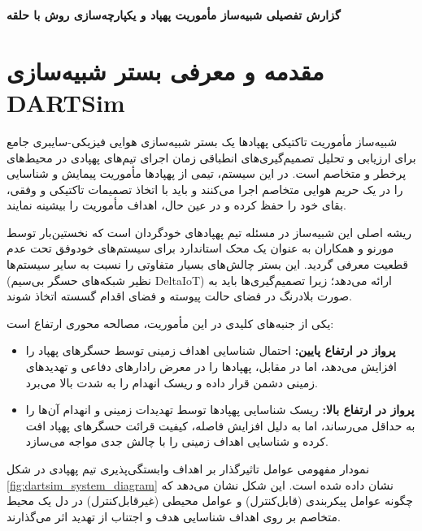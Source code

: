 \documentclass[oneside,openany,a4paper,12pt]{article}
\providecommand{\AutoPersianDigits}{}
\begin{document}
\AutoPersianDigits
{}

\begin{center}
    \vspace*{1cm}
    \Huge\textbf{گزارش تفصیلی شبیه‌ساز مأموریت پهپاد  و یکپارچه‌سازی روش  با حلقه }
\end{center}

\newpage
\tableofcontents
\newpage

\section{مقدمه و معرفی بستر شبیه‌سازی DARTSim}
شبیه‌ساز مأموریت تاکتیکی پهپادها  \cite{MorenoDART2019} یک بستر شبیه‌سازی هوایی فیزیکی-سایبری جامع برای ارزیابی و تحلیل تصمیم‌گیری‌های انطباقی زمان اجرای تیم‌های پهپادی در محیط‌های پرخطر و متخاصم است. در این سیستم، تیمی از پهپادها مأموریت پیمایش و شناسایی را در یک حریم هوایی متخاصم اجرا می‌کنند و باید با اتخاذ تصمیمات تاکتیکی و وفقی، بقای خود را حفظ کرده و در عین حال، اهداف مأموریت را بیشینه نمایند.

ریشه اصلی این شبیه‌ساز در مسئله تیم پهپادهای خودگردان  است که نخستین‌بار توسط مورنو و همکاران \cite{moreno2015proactive} به عنوان یک محک استاندارد برای سیستم‌های خودوفق تحت عدم قطعیت معرفی گردید. این بستر چالش‌های بسیار متفاوتی را نسبت به سایر سیستم‌ها (نظیر شبکه‌های حسگر بی‌سیم DeltaIoT) ارائه می‌دهد؛ زیرا تصمیم‌گیری‌ها باید به صورت بلادرنگ در فضای حالت پیوسته و فضای اقدام گسسته اتخاذ شوند.

یکی از جنبه‌های کلیدی در این مأموریت، مصالحه محوری ارتفاع  است:
\begin{itemize}
    \item \textbf{پرواز در ارتفاع پایین:} احتمال شناسایی اهداف زمینی توسط حسگرهای پهپاد را افزایش می‌دهد، اما در مقابل، پهپادها را در معرض رادارهای دفاعی و تهدیدهای زمینی دشمن قرار داده و ریسک انهدام را به شدت بالا می‌برد.
    \item \textbf{پرواز در ارتفاع بالا:} ریسک شناسایی پهپادها توسط تهدیدات زمینی و انهدام آن‌ها را به حداقل می‌رساند، اما به دلیل افزایش فاصله، کیفیت قرائت حسگرهای پهپاد افت کرده و شناسایی اهداف زمینی را با چالش جدی مواجه می‌سازد.
\end{itemize}

نمودار مفهومی عوامل تاثیرگذار بر اهداف وابستگی‌پذیری تیم پهپادی در شکل \ref{fig:dartsim_system_diagram} نشان داده شده است. این شکل نشان می‌دهد که چگونه عوامل پیکربندی (قابل‌کنترل) و عوامل محیطی (غیرقابل‌کنترل) در دل یک محیط متخاصم بر روی اهداف شناسایی هدف و اجتناب از تهدید اثر می‌گذارند.
\end{document}
